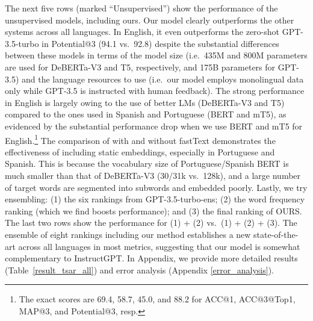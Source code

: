\documentclass[11pt]{article}
\newcommand{\tabref}[2][]{Table#1~\ref{#2}\xspace}
\begin{document}
The next five rows (marked ``Unsupervised'') show the performance of the unsupervised models, including ours. Our model clearly outperforms the other systems across all languages. In English, it even outperforms the zero-shot GPT-3.5-turbo in Potential@3 (94.1 vs.\ 92.8) despite the substantial differences between these models in terms of the model size (i.e.\ 435M and 800M parameters are used for DeBERTa-V3 and T5, respectively, and 175B parameters for GPT-3.5) and the language resources to use (i.e.\ our model employs monolingual data only while GPT-3.5 is instructed with human feedback). The strong performance in English is largely owing to the use of better LMs (DeBERTa-V3 and T5) compared to the ones used in Spanish and Portuguese (BERT and mT5), as evidenced by the substantial performance drop when we use BERT and mT5 for English.\footnote{The exact scores are 69.4, 58.7, 45.0, and 88.2 for ACC@1, ACC@3@Top1, MAP@3, and Potential@3, resp.} The comparison of \citet{wada-etal-2022-unsupervised} with and without fastText demonstrates the effectiveness of including static embeddings, especially in Portuguese and Spanish. This is because the vocabulary size of Portuguese/Spanish BERT is much smaller than that of DeBERTa-V3 (30/31k vs.\ 128k), and a large number of target words are segmented into subwords and embedded poorly. Lastly, we try ensembling: (1) the six rankings from GPT-3.5-turbo-ens; (2) the word frequency ranking (which we find boosts performance); and (3) the final ranking of OURS. The last two rows show the performance for (1) + (2) vs.\ (1) + (2) + (3). The ensemble of eight rankings including our method establishes a new state-of-the-art across all languages in most metrics, suggesting that our model is somewhat complementary to InstructGPT. 
In Appendix, we provide more detailed results (\tabref[]{result_tsar_all}) and error analysis (Appendix \ref{error_analysis}).
\end{document}
